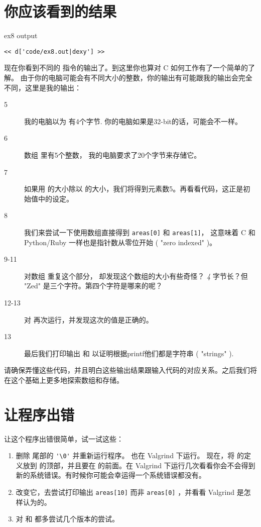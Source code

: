 \section{你应该看到的结果}

\begin{code}{ex8 output}
\begin{lstlisting}
<< d['code/ex8.out|dexy'] >>
\end{lstlisting}
\end{code}

现在你看到不同的  指令的输出了。到这里你也算对 C 如何工作有了一个简单的了解。 由于你的电脑可能会有不同大小的整数，你的输出有可能跟我的输出会完全不同，这里是我的输出：

\begin{description}
\item [5] 我的电脑以为  有4个字节. 你的电脑如果是32-bit的话，可能会不一样。
\item [6] 数组  里有5个整数， 我的电脑要求了20个字节来存储它。
\item [7] 如果用  的大小除以  的大小，我们将得到元素数5。再看看代码，这正是初始值中的设定。
\item [8] 我们来尝试一下使用数组直接得到 \verb|areas[0]| 和 \verb|areas[1]|， 这意味着 C 和 Python/Ruby 一样也是指针数从零位开始 ( "zero indexed" )。
\item [9-11] 对数组  重复这个部分， 却发现这个数组的大小有些奇怪？ \emph{4} 字节长？但 "Zed" 是三个字符。第四个字符是哪来的呢？
\item [12-13] 对  再次运行，并发现这次的值是正确的。 
\item [13] 最后我们打印输出  和  以证明根据printf他们都是字符串 ( "strings" ).
\end{description}

请确保弄懂这些代码，并且明白这些输出结果跟输入代码的对应关系。之后我们将在这个基础上更多地探索数组和存储。

\section{让程序出错}

让这个程序出错很简单，试一试这些：

\begin{enumerate}
\item 删除  尾部的 \verb|'\0'| 并重新运行程序。 也在 Valgrind 下运行。 现在，将  的定义放到  的顶部，并且要在  的前面。在 Valgrind 下运行几次看看你会不会得到新的系统错误。有时候你可能会幸运得一个系统错误都没有。
\item 改变它，去尝试打印输出 \verb|areas[10]| 而非 \verb|areas[0]| ，并看看 Valgrind 是怎样认为的。
\item 对  和  都多尝试几个版本的尝试。
\end{enumerate}


